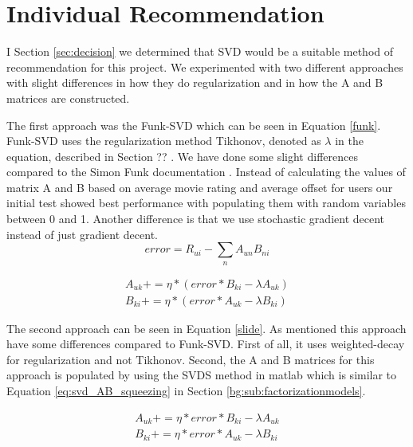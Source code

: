 \section{Individual Recommendation}\label{sec:individual_recommendation}
I Section \ref{sec:decision} we determined that SVD would be a suitable method of recommendation for this project. 
We experimented with two different approaches with slight differences in how they do regularization and in how the A and B matrices are constructed.

The first approach was the Funk-SVD which can be seen in Equation \ref{funk}. Funk-SVD uses the regularization method Tikhonov, denoted as $\lambda$ in the equation, described in Section ?? . We have done some slight differences compared to the Simon Funk documentation . Instead of calculating the values of matrix A and B based on average movie rating and average offset for users our initial test showed best performance with populating them with random variables between 0 and 1. Another difference is that we use stochastic gradient decent instead of just gradient decent. 
\begin{equation}
error = R_{ui} - \sum_n A_{un}B_{ni}
\end{equation}

\begin{equation}\label{funk}
\begin{aligned}
A_{uk} += \eta * (error * B_{ki} - \lambda A_{uk}) \\
B_{ki} += \eta * (error * A_{uk} - \lambda B_{ki})
\end{aligned}
\end{equation}

The second approach can be seen in Equation \ref{slide}.  As mentioned this approach have some differences compared to Funk-SVD. First of all, it uses weighted-decay for regularization and not Tikhonov. Second, the A and B matrices for this approach is populated by using the SVDS method in matlab which is similar to Equation \ref{eq:svd_AB_squeezing} in Section \ref{bg:sub:factorizationmodels}.

\begin{equation}\label{slides}
\begin{aligned}
A_{uk} += \eta * error *B_{ki} - \lambda A_{uk} \\
B_{ki} += \eta * error *A_{uk} - \lambda B_{ki} 
\end{aligned}
\end{equation}

